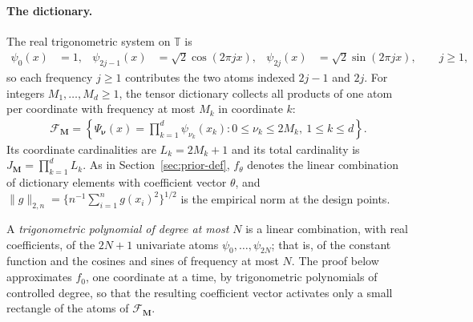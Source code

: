 \paragraph*{The dictionary.}
The real trigonometric system on $\mathbb T$ is
\begin{align*}
\psi_0(x)&=1,
&\psi_{2j-1}(x)&=\sqrt{2}\cos(2\pi jx),
&\psi_{2j}(x)&=\sqrt{2}\sin(2\pi jx),\qquad j\geq1,
\end{align*}
so each frequency $j\geq1$ contributes the two atoms indexed $2j-1$ and $2j$. For integers $M_1,\ldots,M_d\geq1$, the tensor dictionary collects all products of one atom per coordinate with frequency at most $M_k$ in coordinate $k$:
\begin{align*}
\mathcal F_{\boldsymbol M}
=\left\{\Psi_{\boldsymbol\nu}(x)=
\prod_{k=1}^d\psi_{\nu_k}(x_k):
0\leq\nu_k\leq2M_k,\ 1\leq k\leq d\right\}.
\end{align*}
Its coordinate cardinalities are $L_k=2M_k+1$ and its total cardinality is $J_{\boldsymbol M}=\prod_{k=1}^dL_k$. As in Section~\ref{sec:prior-def}, $f_\theta$ denotes the linear combination of dictionary elements with coefficient vector $\theta$, and $\|g\|_{2,n}=\{n^{-1}\sum_{i=1}^ng(x_i)^2\}^{1/2}$ is the empirical norm at the design points.

A \emph{trigonometric polynomial of degree at most $N$} is a linear combination, with real coefficients, of the $2N+1$ univariate atoms $\psi_0,\ldots,\psi_{2N}$; that is, of the constant function and the cosines and sines of frequency at most $N$. The proof below approximates $f_0$, one coordinate at a time, by trigonometric polynomials of controlled degree, so that the resulting coefficient vector activates only a small rectangle of the atoms of $\mathcal F_{\boldsymbol M}$.

